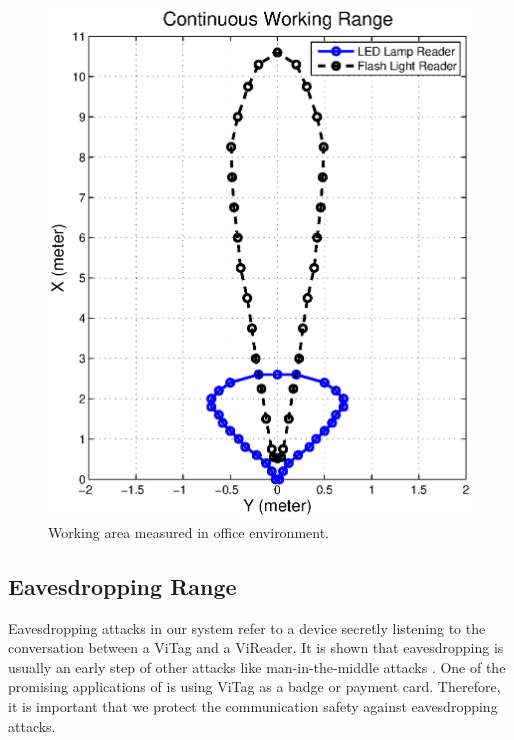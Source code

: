 \begin{figure}[!ht]
\centering
\includegraphics[width=0.7\columnwidth] {fig/ContinuesWorkingRange_flash.eps}
\vskip -0.05in
\caption{Working area measured in office environment.  }\label{fig:ContinuesWorkingRange}
\vskip -0.05in
\end{figure}



\subsection{Eavesdropping Range}\label{sec:secure}

Eavesdropping attacks in our system refer to a device secretly listening to the conversation between a ViTag and a ViReader. It is shown that eavesdropping is usually an early step of other attacks like man-in-the-middle attacks \cite{rfidsec1,rfidsec2}. One of the promising applications of \retro is using ViTag as a badge or payment card. Therefore, it is important that we protect the communication safety against eavesdropping attacks. 


